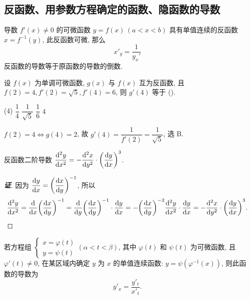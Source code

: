 \subsection{反函数、用参数方程确定的函数、隐函数的导数}

\begin{theorem}[反函数的导数]
    导数 $f'(x)\neq0$ 的可微函数 $y=f(x)~  (a<x<b)$ 具有单值连续的反函数 $x=f^{-1}(y)$,
    此反函数可微, 那么 $$x'_y=\dfrac{1}{y_x'}$$ 反函数的导数等于原函数的导数的倒数.
\end{theorem}

\begin{example}
    设 $f(x)$ 为单调可微函数, $g(x)$ 与 $f(x)$ 互为反函数, 且 $f(2)=4,f'(2)=\sqrt{5},f'(4)=6$, 则 $g'(4)$ 等于 (\quad).
    \begin{tasks}(4)
        \task $\dfrac{1}{4}$
        \task $\dfrac{1}{\sqrt{5}}$
        \task $\dfrac{1}{6}$
        \task $4$
    \end{tasks}
\end{example}
\begin{solution}
    $f(2)=4\Leftrightarrow g(4)=2$, 故 $g'(4)=\dfrac{1}{f'(2)}=\dfrac{1}{\sqrt{5}}$, 选 B.
\end{solution}

\begin{theorem}[反函数的二阶导数]
    反函数二阶导数 $\displaystyle \dv[2]{y}{x}=-\dv[2]{x}{y}\cdot\qty(\dv{y}{x})^{3}$.
\end{theorem}
\begin{proof}[{\songti \textbf{证}}]
    因为 $\displaystyle \dv{y}{x}=\qty(\dv{x}{y})^{-1}$, 所以 
    $$
    \dv[2]{y}{x}=\dv{x}\qty(\dv{x}{y})^{-1}=\dv{y}\qty(\dv{x}{y})^{-1}\cdot\dv{y}{x}=-\qty(\dv{x}{y})^{-2}\dv[2]{y}{x}\cdot\dv{y}{x}=-\dv[2]{x}{y}\cdot\qty(\dv{y}{x})^{3}.
    $$
\end{proof}

\begin{theorem}[用参数方程确定的函数的导数]
    若方程组
    $\begin{cases}
            x=\varphi(t) \\
            y=\psi (t)
        \end{cases}(\alpha<t<\beta)$, 其中 $\varphi(t)$ 和 $\psi(t)$ 为可微函数, 且 $\varphi'(t)\neq0$,
    在某区域内确定 $y$ 为 $x$ 的单值连续函数: $y=\psi\left(\varphi^{-1}(x)\right)$, 则此函数的导数为
    $$y'_x=\dfrac{y'_t}{x'_t}.$$
\end{theorem}

